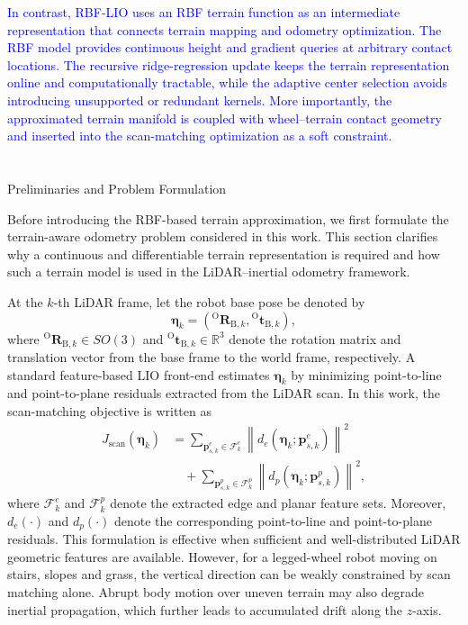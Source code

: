 \documentclass[journal,twoside,web]{ieeecolor}
\makeatletter
\newcommand{\cs}[1]{\textcolor{blue}{#1}}
\let\origsection\section
\def\section{\@ifstar\sectionstarcolor\sectioncolor}
\def\sectioncolor#1{\origsection{\textcolor{nblue}{#1}}}
\def\sectionstarcolor#1{\origsection*{#1}}
\makeatother
\begin{document}
\cs{In contrast, RBF-LIO uses an RBF terrain function as an intermediate representation that connects terrain mapping and odometry optimization. The RBF model provides continuous height and gradient queries at arbitrary contact locations. The recursive ridge-regression update keeps the terrain representation online and computationally tractable, while the adaptive center selection avoids introducing unsupported or redundant kernels. More importantly, the approximated terrain manifold is coupled with wheel--terrain contact geometry and inserted into the scan-matching optimization as a soft constraint. }

\section{Preliminaries and Problem Formulation}
\label{sec:problem_formulation}

Before introducing the RBF-based terrain approximation, we first formulate the terrain-aware odometry problem considered in this work. This section clarifies why a continuous and differentiable terrain representation is required and how such a terrain model is used in the LiDAR--inertial odometry framework.

At the $k$-th LiDAR frame, let the robot base pose be denoted by
\begin{equation}
    \bm{\eta}_k =
    \left(
    {}^{\mathrm{O}}\mathbf{R}_{\mathrm{B},k},
    {}^{\mathrm{O}}\mathbf{t}_{\mathrm{B},k}
    \right),
\end{equation}
where ${}^{\mathrm{O}}\mathbf{R}_{\mathrm{B},k}\in SO(3)$ and
${}^{\mathrm{O}}\mathbf{t}_{\mathrm{B},k}\in\mathbb{R}^{3}$ denote the rotation matrix and translation vector from the base frame to the world frame, respectively. A standard feature-based LIO front-end estimates $\bm{\eta}_k$ by minimizing point-to-line and point-to-plane residuals extracted from the LiDAR scan. In this work, the scan-matching objective is written as
\begin{equation}
\begin{aligned}
    J_{\mathrm{scan}}(\bm{\eta}_k)
    &=
    \sum_{\mathbf{p}^{e}_{s,k}\in\mathcal{F}^{e}_{k}}
    \left\|
    d_e\left(\bm{\eta}_k;\mathbf{p}^{e}_{s,k}\right)
    \right\|^{2}  \\
    &\quad+
    \sum_{\mathbf{p}^{p}_{s,k}\in\mathcal{F}^{p}_{k}}
    \left\|
    d_p\left(\bm{\eta}_k;\mathbf{p}^{p}_{s,k}\right)
    \right\|^{2},
\end{aligned}
\label{eq:problem_scan_matching}
\end{equation}
where $\mathcal{F}^{e}_{k}$ and $\mathcal{F}^{p}_{k}$ denote the extracted edge and planar feature sets. Moreover, $d_e(\cdot)$ and $d_p(\cdot)$ denote the corresponding point-to-line and point-to-plane residuals. This formulation is effective when sufficient and well-distributed LiDAR geometric features are available. However, for a legged-wheel robot moving on stairs, slopes and grass, the vertical direction can be weakly constrained by scan matching alone. Abrupt body motion over uneven terrain may also degrade inertial propagation, which further leads to accumulated drift along the $z$-axis.
\end{document}
